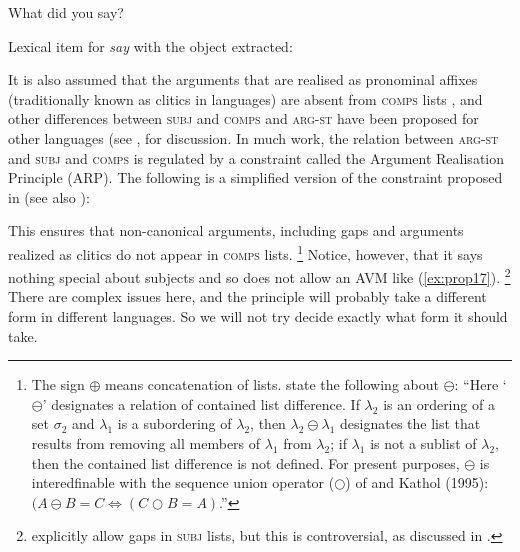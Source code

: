 \documentclass[output=paper
	        ,collection
	        ,collectionchapter
 	        ,biblatex
                ,babelshorthands
                ,newtxmath
                ,draftmode
                ,colorlinks, citecolor=brown
]{langscibook}
\begin{document}
\ea\label{ex:prop18}
What did you say?

\ex\label{ex:prop19}
Lexical item for \emph{say} with the object extracted:\\
\z

\noindent
It is also assumed that the arguments that are realised as pronominal affixes (traditionally known
as clitics in  languages) are absent from \textsc{comps} lists
\parencites[Section~3]{MS97a-u}{monachesi05},
and other differences between \textsc{subj} and \textsc{comps} and \textsc{arg-st} have been
proposed for other languages (see \citealt{MS99a}, \addpages for
discussion. In much work, the relation between \textsc{arg-st} and \textsc{subj} and \textsc{comps}
is regulated by a constraint called the Argument Realisation Principle (ARP).\label{page-argument-realization-principle} The following is a simplified
version of the constraint proposed in \citet[171]{GSag2000a-u} (see also \citealt[12]{BMS2001a}): 

\ea\label{ex:prop20}
 \impl
{}
\z

\noindent
This ensures that non-canonical arguments, including gaps and arguments realized as clitics do not appear in \textsc{comps} lists.%
%
\footnote{The sign $\oplus$ means concatenation of lists. \citet[]{GSag2000a-u} state the
  following about $\ominus$: ``Here `$\ominus$' designates a relation of contained list difference. If
$\lambda_2$ is an ordering of a set $\sigma_2$ and $\lambda_1$ is a subordering of $\lambda_2$, then
$\lambda_2 \ominus \lambda_1$ designates the list that results from removing all members of
$\lambda_1$ from $\lambda_2$; if $\lambda_1$ is not a sublist of $\lambda_2$, then the contained
list difference is not defined. For present purposes, $\ominus$ is interedfinable with the sequence
union operator ($\bigcirc$) of \citet{Reape94a} and Kathol (1995): $(A \ominus B = C
\Leftrightarrow (C \bigcirc B = A)$.''}
%
Notice, however, that it says nothing special about subjects and so does not allow an AVM like (\ref{ex:prop17}).%
%
\footnote{\citet[177--183]{GSag2000a-u} explicitly allow gaps in \textsc{subj} lists, but this is
  controversial, as discussed in \crossrefchapterw[\page
  \pageref{udc:page-subject-gaps-start}--\pageref{udc:page-subject-gaps-end}]{udc}.}
%
There are complex issues here, and the principle will probably take a different form in different languages. So we will not try decide exactly what form it should take.
\end{document}
